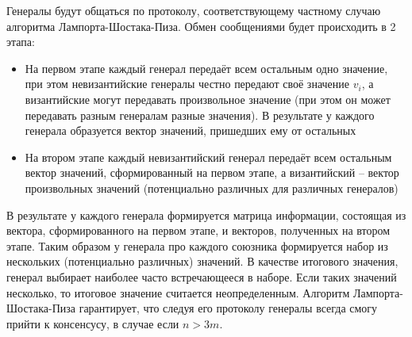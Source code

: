 Генералы будут общаться по протоколу, соответствующему частному случаю алгоритма Лампорта-Шостака-Пиза. Обмен сообщениями будет происходить в 2 этапа:
\begin{itemize}
	\item На первом этапе каждый генерал передаёт всем остальным одно значение, при этом невизантийские генералы честно передают своё значение $v_i$, а византийские могут передавать произвольное значение (при этом он может передавать разным генералам разные значения). В результате у каждого генерала образуется вектор значений, пришедших ему от остальных
	\item На втором этапе каждый невизантийский генерал передаёт всем остальным вектор значений, сформированный на первом этапе, а византийский – вектор произвольных значений (потенциально различных для различных генералов)
\end{itemize}
    
В результате у каждого генерала формируется матрица информации, состоящая из вектора, сформированного на первом этапе, и векторов, полученных на втором этапе.
Таким образом у генерала про каждого союзника формируется набор из нескольких (потенциально различных) значений. В качестве итогового значения, генерал выбирает наиболее часто встречающееся в наборе. Если таких значений несколько, то итоговое значение считается неопределенным.
Алгоритм Лампорта-Шостака-Пиза гарантирует, что следуя его протоколу генералы всегда смогу прийти к консенсусу, в случае если $n > 3m$.
